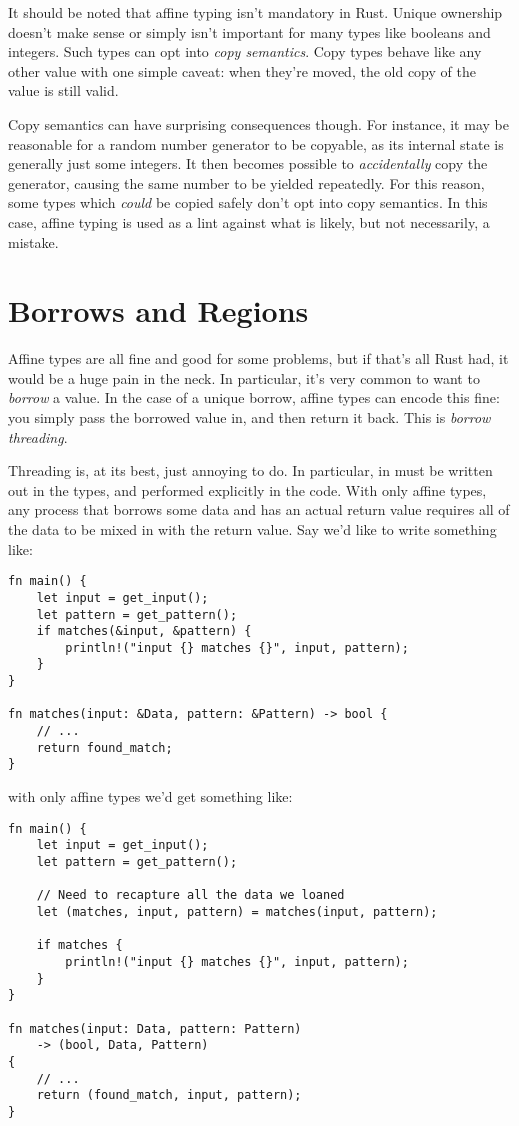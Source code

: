 It should be noted that affine typing isn't mandatory in Rust. Unique ownership
doesn't make sense or simply isn't important for many types like booleans and
integers. Such types can opt into \emph{copy semantics}. Copy types behave like any
other value with one simple caveat: when they're moved, the old copy of the
value is still valid.

Copy semantics can have surprising consequences though. For instance, it may be
reasonable for a random number generator to be copyable, as its internal
state is generally just some integers. It then becomes possible to
\emph{accidentally} copy the generator, causing the same number to be yielded
repeatedly. For this reason, some types which \emph{could} be copied safely don't opt
into copy semantics. In this case, affine typing is used as a lint against what
is likely, but not necessarily, a mistake.





\section{Borrows and Regions}

Affine types are all fine and good for some problems, but if that's all Rust had,
it would be a huge pain in the neck. In particular, it's very common to want
to \emph{borrow} a value. In the case of a unique borrow, affine types can encode
this fine: you simply pass the borrowed value in, and then return it back. This
is \emph{borrow threading}.

Threading is, at its best, just annoying to do. In particular, in must be written
out in the types, and performed explicitly in the code. With only affine types,
any process that borrows some data and has an actual return value requires
all of the data to be mixed in with the return value. Say we'd like to write
something like:

\begin{verbatim}
fn main() {
    let input = get_input();
    let pattern = get_pattern();
    if matches(&input, &pattern) {
        println!("input {} matches {}", input, pattern);
    }
}

fn matches(input: &Data, pattern: &Pattern) -> bool {
    // ...
    return found_match;
}
\end{verbatim}

with only affine types we'd get something like:

\begin{verbatim}
fn main() {
    let input = get_input();
    let pattern = get_pattern();

    // Need to recapture all the data we loaned
    let (matches, input, pattern) = matches(input, pattern);

    if matches {
        println!("input {} matches {}", input, pattern);
    }
}

fn matches(input: Data, pattern: Pattern)
    -> (bool, Data, Pattern)
{
    // ...
    return (found_match, input, pattern);
}
\end{verbatim}

